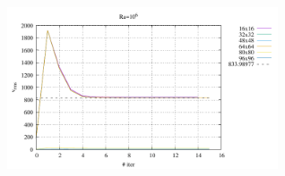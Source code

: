 \begin{center}
\includegraphics[width=8cm]{python_codes/md/results_ss/vrms_Ra1e6.pdf}
\end{center}




